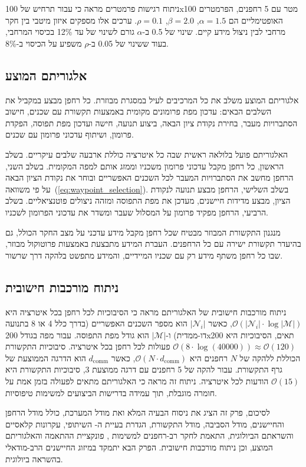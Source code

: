 ניתוח רגישות פרמטרים מראה כי עבור תרחיש  של 100x100 מטר עם 5 רחפנים, הפרמטרים האופטימליים הם $\alpha=1.5$, $\beta=2.0$, $\rho=0.1$. ערכים אלו מספקים איזון מיטבי בין חקר מרחבי לבין ניצול מידע קיים. שינוי של 0.5 ב-$\alpha$ גורם לשינוי של עד 12\% בכיסוי המרחבי, בעוד ששינוי של 0.05 ב-$\rho$ משפיע על הכיסוי ב-8\%.

\subsection{אלגוריתם  המוצע}
\label{sec:proposed_algorithm}

אלגוריתם  המוצע משלב את כל המרכיבים לעיל במסגרת מבוזרת. כל רחפן מבצע במקביל את השלבים הבאים: עדכון מפת פרומונים מקומית באמצעות תקשורת עם שכנים, חישוב הסתברויות מעבר, בחירת נקודת ציון הבאה, ביצוע תנועה, חישה ועדכון מפת תפוסה, הפקדת פרומון, ושיתוף עדכוני פרומון עם שכנים.

האלגוריתם פועל בלולאה ראשית שבה כל איטרציה כוללת ארבעה שלבים עיקריים. בשלב הראשון, כל רחפן מקבל עדכוני פרומון משכניו וממזג אותם למפה המקומית. בשלב השני, הרחפן מחשב את הסתברויות המעבר לכל השכנים האפשריים ובוחר את נקודת הציון הבאה על פי משוואה~(\ref{eq:waypoint_selection}). בשלב השלישי, הרחפן מבצע תנועה לנקודת הציון, מבצע מדידות חיישנים, מעדכן את מפת התפוסה ומזהה ניצולים פוטנציאליים. בשלב הרביעי, הרחפן מפקיד פרומון על המסלול שעבר ומשדר את עדכוני הפרומון לשכניו.

מנגנון התקשורת המבוזר מבטיח שכל רחפן מקבל מידע עדכני על מצב החקר הכולל, גם בהיעדר תקשורת ישירה עם כל הרחפנים. העברת המידע מתבצעת באמצעות פרוטוקול  מבוזר, שבו כל רחפן משתף מידע רק עם שכניו המיידיים, והמידע מתפשט בלהקה דרך שרשור.

\subsection{ניתוח מורכבות חישובית}
\label{sec:ch02_complexity}

ניתוח מורכבות חישובית של האלגוריתם מראה כי הסיבוכיות לכל רחפן בכל איטרציה היא $\mathcal{O}(|\mathcal{N}_{i}| \cdot \log|\mathcal{M}|)$, כאשר $|\mathcal{N}_{i}|$ הוא מספר השכנים האפשריים (בדרך כלל 4 או 8 בתנועה דו-ממדית) ו-$|\mathcal{M}|$ הוא גודל מפת התפוסה. עבור מפה בגודל 200x200 תאים, הסיבוכיות היא $\mathcal{O}(8 \cdot \log(40000)) \approx \mathcal{O}(120)$ פעולות לכל רחפן בכל איטרציה. סיבוכיות התקשורת הכוללת ללהקה של $N$ רחפנים היא $\mathcal{O}(N \cdot d_{\text{comm}})$, כאשר $d_{\text{comm}}$ הוא הדרגה הממוצעת של גרף התקשורת. עבור להקה של 5 רחפנים עם דרגה ממוצעת 3, סיבוכיות התקשורת היא $\mathcal{O}(15)$ הודעות לכל איטרציה. ניתוח זה מראה כי האלגוריתם מתאים לפעולה בזמן אמת על חומרה מוגבלת, תוך עמידה בדרישות הביצועים למשימות  טיפוסיות.

לסיכום, פרק זה הציג את ניסוח הבעיה המלא ואת מודל המערכת, כולל מודל הרחפן והחיישנים, מודל הסביבה, מודל התקשורת, הגדרת בעיית ה- השיתופי, עקרונות  קלאסיים והשראתם הביולוגית, התאמת  לחקר רב-רחפנים למשימות , פונקציית ההתאמה והאלגוריתם המוצע, וכן ניתוח מורכבות חישובית. הפרק הבא יתמקד במיזוג החיישנים הרב-מודאלי בהשראה ביולוגית.

\cite{Dorigo2004ACO, Thrun2005Probabilistic, Grisetti2010GraphSLAM, Choudhary2017Comm, Ranjbar2012Pheromone}

